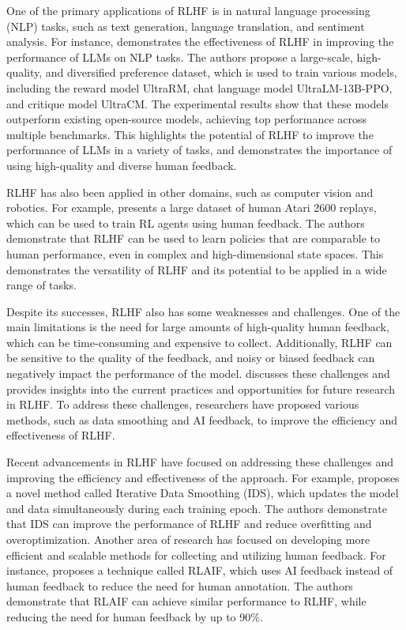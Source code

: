 \documentclass[11pt]{article}
\begin{document}
One of the primary applications of RLHF is in natural language processing (NLP) tasks, such as text generation, language translation, and sentiment analysis. For instance, \cite{ref154} demonstrates the effectiveness of RLHF in improving the performance of LLMs on NLP tasks. The authors propose a large-scale, high-quality, and diversified preference dataset, which is used to train various models, including the reward model UltraRM, chat language model UltraLM-13B-PPO, and critique model UltraCM. The experimental results show that these models outperform existing open-source models, achieving top performance across multiple benchmarks. This highlights the potential of RLHF to improve the performance of LLMs in a variety of tasks, and demonstrates the importance of using high-quality and diverse human feedback.

RLHF has also been applied in other domains, such as computer vision and robotics. For example, \cite{ref155} presents a large dataset of human Atari 2600 replays, which can be used to train RL agents using human feedback. The authors demonstrate that RLHF can be used to learn policies that are comparable to human performance, even in complex and high-dimensional state spaces. This demonstrates the versatility of RLHF and its potential to be applied in a wide range of tasks.

Despite its successes, RLHF also has some weaknesses and challenges. One of the main limitations is the need for large amounts of high-quality human feedback, which can be time-consuming and expensive to collect. Additionally, RLHF can be sensitive to the quality of the feedback, and noisy or biased feedback can negatively impact the performance of the model. \cite{ref156} discusses these challenges and provides insights into the current practices and opportunities for future research in RLHF. To address these challenges, researchers have proposed various methods, such as data smoothing and AI feedback, to improve the efficiency and effectiveness of RLHF.

Recent advancements in RLHF have focused on addressing these challenges and improving the efficiency and effectiveness of the approach. For example, \cite{ref157} proposes a novel method called Iterative Data Smoothing (IDS), which updates the model and data simultaneously during each training epoch. The authors demonstrate that IDS can improve the performance of RLHF and reduce overfitting and overoptimization. Another area of research has focused on developing more efficient and scalable methods for collecting and utilizing human feedback. For instance, \cite{ref158} proposes a technique called RLAIF, which uses AI feedback instead of human feedback to reduce the need for human annotation. The authors demonstrate that RLAIF can achieve similar performance to RLHF, while reducing the need for human feedback by up to 90\%.
\end{document}
